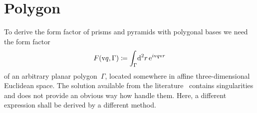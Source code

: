 
\section{Polygon}\label{SFFPolygon}

%
\def\R{\v{R}}
\def\E{\v{E}}
\def\x{\v{x}}
\def\V{\v{V}}
\def\qp{\v{q}_\parallel}
\def\n{\v{\hat n}}
\def\uq{\v{\hat q}}
\def\uqp{\v{\hat q}_\parallel}

To derive the form factor of prisms and pyramids with polygonal bases
we need the form factor
\begin{equation}\label{Eff2d}
  F(\text{v}{q},\Gamma)
  \coloneqq \int_{\Gamma}\!\text{d}^2r\, \text{e}^{i\text{v}{q}\text{v}{r}}
\end{equation}
of an arbitrary planar polygon~$\Gamma$,
located somewhere in affine three-dimensional Euclidean space.
The solution available from the literature~\cite{LeMi83}
contains singularities and does not provide an obvious way how handle them.
Here, a different expression shall be derived by a different method.

